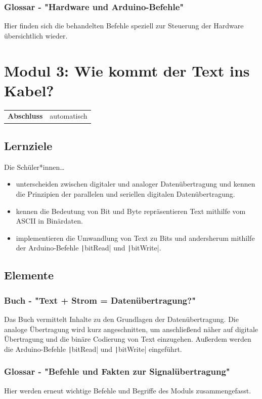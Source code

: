 \documentclass[a4paper]{article}
\begin{document}
\subsubsection{Glossar - "Hardware und Arduino-Befehle"}
Hier finden sich die behandelten Befehle speziell zur Steuerung der Hardware übersichtlich wieder.

\section{Modul 3: Wie kommt der Text ins Kabel?}
\begin{tabular}{@{}l l}
    \textbf{Abschluss} & automatisch
\end{tabular}

\subsection{Lernziele}
Die Schüler*innen\dots
\begin{itemize}
    \item unterscheiden zwischen digitaler und analoger Datenübertragung und kennen die Prinzipien der parallelen und seriellen digitalen Datenübertragung.
    \item kennen die Bedeutung von Bit und Byte
    repräsentieren Text mithilfe vom ASCII in Binärdaten.
    \item implementieren die Umwandlung von Text zu Bits und andersherum mithilfe der Arduino-Befehle \texttt|bitRead| und \texttt|bitWrite|.
\end{itemize}

\subsection{Elemente}
\subsubsection{Buch - "Text + Strom = Datenübertragung?"}
Das Buch vermittelt Inhalte zu den Grundlagen der Datenübertragung. Die analoge Übertragung wird kurz angeschnitten, um anschließend näher auf digitale Übertragung und die binäre Codierung von Text einzugehen. Außerdem werden die Arduino-Befehle \texttt|bitRead| und \texttt|bitWrite| eingeführt.

\subsubsection{Glossar - "Befehle und Fakten zur Signalübertragung"}
Hier werden erneut wichtige Befehle und Begriffe des Moduls zusammengefasst.
\end{document}
